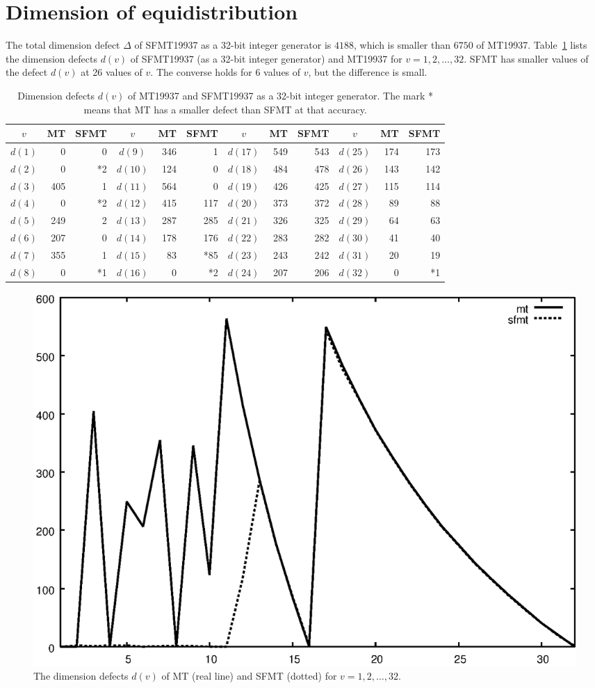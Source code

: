 \documentclass[acmnow]{acmtrans2m}
\begin{document}
\section{Dimension of equidistribution}
The total dimension defect $\Delta$ of SFMT19937
as a 32-bit integer generator is $4188$, 
which is smaller than $6750$ of MT19937.
Table~\ref{tab:dd} lists the dimension defects $d(v)$
of SFMT19937 (as a 32-bit integer generator) 
and MT19937 for $v=1,2,\ldots, 32$.
SFMT has smaller values of the defect $d(v)$
at 26 values of $v$. The converse holds for 6 values of
$v$, but the difference is small.
\begin{table}
\begin{tabular}{|c|rr||c|rr||c|rr||c|rr|} \hline
$v$ & MT & SFMT & $v$ & MT & SFMT & $v$ & MT & SFMT & $v$ & MT & SFMT\\ \hline
$d(1)$ & 0 & 0 & $d(9)$ & 346 & 1 & $d(17)$ & 549 & 543 & $d(25)$ & 174 & 173 \\
$d(2)$ & 0 & *2 & $d(10)$ & 124 & 0 & $d(18)$ & 484 & 478 & $d(26)$ & 143 & 142
\\
$d(3)$ & 405 & 1 & $d(11)$ & 564 & 0 & $d(19)$ & 426 & 425 & $d(27)$ & 115 & 114
\\
$d(4)$ & 0 & *2 & $d(12)$ & 415 & 117 & $d(20)$ & 373 & 372 & $d(28)$ & 89 & 88
\\
$d(5)$ & 249 & 2 & $d(13)$ & 287 & 285 & $d(21)$ & 326 & 325 & $d(29)$ & 64 & 63
\\
$d(6)$ & 207 & 0 & $d(14)$ & 178 & 176 & $d(22)$ & 283 & 282 & $d(30)$ & 41 & 40
\\
$d(7)$ & 355 & 1 & $d(15)$ & 83 & *85 & $d(23)$ & 243 & 242 & $d(31)$ & 20 & 19 
\\
$d(8)$ & 0 & *1 & $d(16)$ & 0 & *2 & $d(24)$ & 207 & 206 & $d(32)$ & 0 & *1 \\
\hline

\end{tabular}
\caption{Dimension defects 
$d(v)$ of MT19937 and SFMT19937
as a 32-bit integer generator.
The mark * means that MT has a smaller defect than SFMT
at that accuracy.
}\label{tab:dd}
\end{table}

\begin{figure}
\begin{center}
\includegraphics[width=0.8\linewidth,height=0.7\textheight,
keepaspectratio]{delta.eps}
\end{center}
\caption{The dimension defects $d(v)$ of MT (real line) and SFMT (dotted)
for $v=1,2,\ldots, 32$.}
\end{figure}
\end{document}
